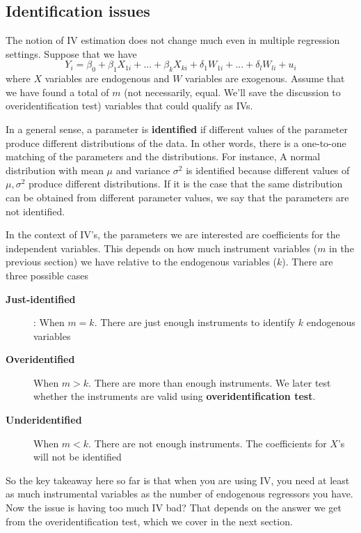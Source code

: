 \documentclass[12pt]{article}
\theoremstyle{definition}
\theoremstyle{property}
\theoremstyle{assumption}
\theoremstyle{example}
\theoremstyle{comment}
\begin{document}
\subsection{Identification issues}
The notion of IV estimation does not change much even in multiple regression settings. Suppose that we have
\[
Y_i = \beta_0 + \beta_1X_{1i} +...+ \beta_kX_{ki} + \delta_1W_{1i}+...+\delta_lW_{li}+u_i 
\]
where $X$ variables are endogenous and $W$ variables are exogenous. Assume that we have found a total of $m$ (not necessarily, equal. We'll save the discussion to overidentification test) variables that could qualify as IVs. 
\par
In a general sense, a parameter is \textbf{identified} if different values of the parameter produce different distributions of the data. In other words, there is a one-to-one matching of the parameters and the distributions. For instance, A normal distribution with mean $\mu$ and variance $\sigma^2$ is identified because different values of $\mu, \sigma^2$ produce different distributions. If it is the case that the same distribution can be obtained from different parameter values, we say that the parameters are not identified. \par\medskip

In the context of IV's, the parameters we are interested are coefficients for the independent variables. This depends on how much instrument variables ($m$ in the previous section) we have relative to the endogenous variables ($k$). There are three possible cases
\begin{description}
\item[\textbf{Just-identified}]: When $m=k$. There are just enough instruments to identify $k$ endogenous variables
\item[\textbf{Overidentified}] When $m>k$. There are more than enough instruments. We later test whether the instruments are valid using \textbf{overidentification test}.
\item[\textbf{Underidentified}] When $m<k$. There are not enough instruments. The coefficients for $X$'s will not be identified 
\end{description}
So the key takeaway here so far is that when you are using IV, you need at least as much instrumental variables as the number of endogenous regressors you have. Now the issue is having too much IV bad? That depends on the answer we get from the overidentification test, which we cover in the next section.\par\medskip
\end{document}
